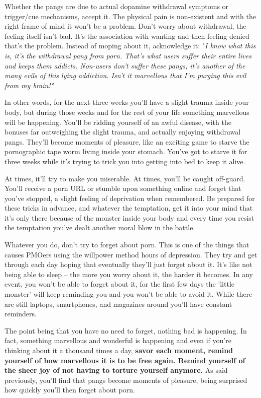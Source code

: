 \documentclass[
]{book}
\begin{document}
Whether the pangs are due to actual dopamine withdrawal symptoms or trigger/cue mechanisms, accept it. The physical pain is non-existent and with the right frame of mind it won't be a problem. Don't worry about withdrawal, the feeling itself isn't bad. It's the association with wanting and then feeling denied that's the problem. Instead of moping about it, acknowledge it: "\emph{I know what this is, it's the withdrawal pang from porn. That's what users suffer their entire lives and keeps them addicts. Non-users don't suffer these pangs, it's another of the many evils of this lying addiction. Isn't it marvellous that I'm purging this evil from my brain!"}

In other words, for the next three weeks you'll have a slight trauma inside your body, but during those weeks and for the rest of your life something marvellous will be happening. You'll be ridding yourself of an awful disease, with the bonuses far outweighing the slight trauma, and actually enjoying withdrawal pangs. They'll become moments of pleasure, like an exciting game to starve the pornographic tape worm living inside your stomach. You've got to starve it for three weeks while it's trying to trick you into getting into bed to keep it alive.

At times, it'll try to make you miserable. At times, you'll be caught off-guard. You'll receive a porn URL or stumble upon something online and forget that you've stopped, a slight feeling of deprivation when remembered. Be prepared for these tricks in advance, and whatever the temptation, get it into your mind that it's only there because of the monster inside your body and every time you resist the temptation you've dealt another moral blow in the battle.

Whatever you do, don't try to forget about porn. This is one of the things that causes PMOers using the willpower method hours of depression. They try and get through each day hoping that eventually they'll just forget about it. It's like not being able to sleep -- the more you worry about it, the harder it becomes. In any event, you won't be able to forget about it, for the first few days the 'little monster' will keep reminding you and you won't be able to avoid it. While there are still laptops, smartphones, and magazines around you'll have constant reminders.

The point being that you have no need to forget, nothing bad is happening. In fact, something marvellous and wonderful is happening and even if you're thinking about it a thousand times a day, \textbf{savor each moment, remind yourself of how marvellous it is to be free again. Remind yourself of the sheer joy of not having to torture yourself anymore.} As said previously, you'll find that pangs become moments of pleasure, being surprised how quickly you'll then forget about porn.
\end{document}
